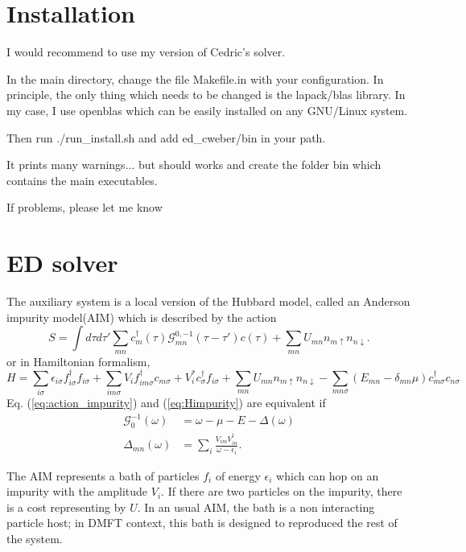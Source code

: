 \documentclass{book}
\def\D{\Delta}
\def\d{\delta}
\def\e{\epsilon}
\def\s{\sigma}
\def\t{\tau}
\def\w{\omega}
\def\dd{\dagger}
\def\ua{\uparrow}
\def\da{\downarrow}
\begin{document}
\section{Installation}

I would recommend to use my version of Cedric's solver.

In the main directory, change the file Makefile.in with your configuration. In principle, the only thing which needs to be changed is the lapack/blas library. In my case, I use openblas which can be easily installed on any GNU/Linux system.

Then run ./run\_install.sh and add ed\_cweber/bin in your path.

It prints many warnings... but should works and create the folder bin which contains the main executables.

If problems, please let me know


\section{ED solver}


The auxiliary system is a local version of the Hubbard model, called  an Anderson impurity model(AIM) which is described by the action
\begin{equation}
  \label{eq:action_impurity}
  S=\int d \t d\t' \sum_{mn} c_{m}^{\dd}(\t)\mathcal{G}_{mn}^{0,-1}(\t-\t')c(\t) +\sum_{mn}U_{mn} n_{m\ua}n_{n\da}.
\end{equation}
or in Hamiltonian formalism,
\begin{equation}
  H =  \sum_{i \s} \e_{i \s} f^{\dd}_{i \s} f_{i \s} + \sum_{im\s}V_i f_{im\s}^{\dd} c_{m\s} + V^*_i  c^{\dd}_{\s}f_{i\s}  +\sum_{mn}U_{mn} n_{m\ua}n_{n\da} -\sum_{mn\s}(E_{mn}-\d_{mn} \mu) c^{\dd}_{m\s}c_{n\s}
    \label{eq:Himpurity}
\end{equation}
Eq. (\ref{eq:action_impurity}) and (\ref{eq:Himpurity}) are equivalent if
\begin{align}
  \mathcal{G}_0^{-1}(\w) &= \w - \mu - E -\D(\w) \\
  \D_{mn}(\w) &= \sum_i \frac{V_{im} V^{\dd}_{in}}{\w-\e_i} .
           \label{eq:def-hybridization}
\end{align}

The AIM represents a bath of  particles $f_i$ of energy $\e_i$ which can hop on an impurity with the amplitude $V_i$. If there are two particles on the impurity, there is a cost representing by $U$.  In an usual AIM, the bath is a non interacting particle host;  in DMFT context, this bath is  designed to reproduced the rest of the system.
\end{document}
